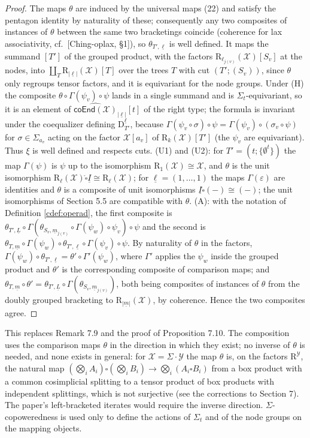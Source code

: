 \documentclass[12pt]{article}
\theoremstyle{plain}
\theoremstyle{definition}
\theoremstyle{remark}
\newcommand{\Cal}[1]{\mathcal{#1}}
\newcommand{\coend}[1]{\mathsf{coEnd}(#1)}
\newcommand{\boxcirc}{\mathring{\square}}
\newcommand{\Dm}{\mathrm{D}}
\newcommand{\Rr}{\mathrm{R}}
\begin{document}
\begin{proof}
The maps $\theta$ are induced by the universal maps (22) and satisfy the pentagon identity by naturality of these; consequently any two composites of instances of $\theta$ between the same two bracketings coincide (coherence for lax associativity, cf.\ [Ching-oplax, \S1]), so $\theta_{T',\underline\ell}$ is well defined. It maps the summand $[T']$ of the grouped product, with the factors $\Rr_{\ell_{j(v)}}(\Cal X)[S_v]$ at the nodes, into $\coprod_T\Rr_{|\underline\ell|}(\Cal X)[T]$ over the trees $T$ with cut $(T';(S_v))$, since $\theta$ only regroups tensor factors, and it is equivariant for the node groups. Under (H) the composite $\theta\circ\Gamma(\psi_v)\circ\psi$ lands in a single summand and is $\Sigma_t$-equivariant, so it is an element of $\widehat{\coend{\Cal X}}_{|\underline\ell|}[t]$ of the right type; the formula is invariant under the coequalizer defining $\Dm^{\underline\ell}_{T'}$, because $\Gamma(\psi_v\circ\sigma)\circ\psi=\Gamma(\psi_v)\circ(\sigma_v\circ\psi)$ for $\sigma\in\Sigma_{a_v}$ acting on the factor $\Cal X[a_v]$ of $\Rr_k(\Cal X)[T']$ (the $\psi_v$ are equivariant). Thus $\xi$ is well defined and respects cuts. (U1) and (U2): for $T'=(t;\{\emptyset^t\})$ the map $\Gamma(\psi)$ is $\psi$ up to the isomorphism $\Rr_1(\Cal X)\cong\Cal X$, and $\theta$ is the unit isomorphism $\Rr_\ell(\Cal X)\boxcirc\underline I\cong\Rr_\ell(\Cal X)$; for $\underline\ell=(1,\dots,1)$ the maps $\Gamma(\varepsilon)$ are identities and $\theta$ is a composite of unit isomorphisms $\underline I\boxcirc(-)\cong(-)$; the unit isomorphisms of Section 5.5 are compatible with $\theta$. (A): with the notation of Definition \ref{cdef:operad}, the first composite is $\theta_{T',\underline L}\circ\Gamma(\theta_{S_v,\underline m_{j(v)}}\circ\Gamma(\psi_w)\circ\psi_v)\circ\psi$ and the second is $\theta_{T,\underline m}\circ\Gamma(\psi_w)\circ\theta_{T',\underline\ell}\circ\Gamma(\psi_v)\circ\psi$. By naturality of $\theta$ in the factors, $\Gamma(\psi_w)\circ\theta_{T',\underline\ell}=\theta'\circ\Gamma'(\psi_w)$, where $\Gamma'$ applies the $\psi_w$ inside the grouped product and $\theta'$ is the corresponding composite of comparison maps; and $\theta_{T,\underline m}\circ\theta'=\theta_{T',\underline L}\circ\Gamma(\theta_{S_v,\underline m_{j(v)}})$, both being composites of instances of $\theta$ from the doubly grouped bracketing to $\Rr_{|\underline m|}(\Cal X)$, by coherence. Hence the two composites agree.
\end{proof}

This replaces Remark 7.9 and the proof of Proposition 7.10. The composition uses the comparison maps $\theta$ in the direction in which they exist; no inverse of $\theta$ is needed, and none exists in general: for $\Cal X=\Sigma\cdot\Cal Y$ the map $\theta$ is, on the factors $\Rr^{\Cal Y}$, the natural map $(\bigotimes_iA_i)\square(\bigotimes_iB_i)\to\bigotimes_i(A_i\square B_i)$ from a box product with a common cosimplicial splitting to a tensor product of box products with independent splittings, which is not surjective (see the corrections to Section 7). The paper's left-bracketed iterates would require the inverse direction. $\Sigma$-copoweredness is used only to define the actions of $\Sigma_t$ and of the node groups on the mapping objects.
\end{document}
